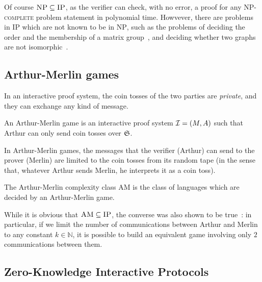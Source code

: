 Of course \(\textsc{NP} \subseteq \textsc{IP}\), as the verifier can check, with no error, a 
proof for any \textsc{NP-complete} problem statement in polynomial time.
Howvever, there are problems in \textsc{IP} which are not known to be in \textsc{NP}, such as 
the problems of deciding the order and the membership of a matrix group~\cite{BabaiS1984}, and 
deciding whether two graphs are not isomorphic~\cite{GoldreichMW1991}.

\subsection{Arthur-Merlin games}

In an interactive proof system, the coin tosses of the two parties are \emph{private}, and 
they can exchange any kind of message.
\begin{definition}
  An Arthur-Merlin game is an interactive proof system \(\mathcal{I} = \left(M, A\right)\) such that
  Arthur can only send coin tosses over \(\mathfrak{\mathfrak{S}}\).
\end{definition}

In Arthur-Merlin games, the messages that the verifier (Arthur) can send to the prover (Merlin) are 
limited to the coin tosses from its random tape (in the sense that, whatever Arthur sends Merlin, 
he interprets it as a coin toss).

\begin{definition}
  The Arthur-Merlin complexity class \textsc{AM} is the class of languages which are decided by an
  Arthur-Merlin game.
\end{definition}

While it is obvious that \(\textsc{AM} \subseteq \textsc{IP}\), the converse was also shown to 
be true~\cite{BabaiS1984}: in particular, if we limit the number of communications between 
Arthur and Merlin to any constant \(k \in \mathbb{N}\), it is possible to build an equivalent 
game involving only \(2\) communications between them.


\subsection{Zero-Knowledge Interactive Protocols}

